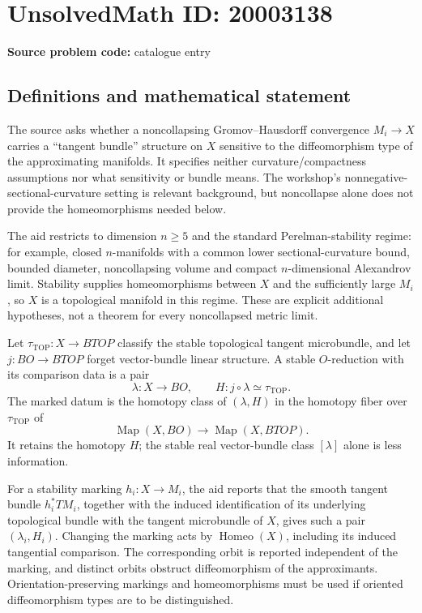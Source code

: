\documentclass[11pt]{article}
\begin{document}
\section*{UnsolvedMath ID: 20003138}
\textbf{Source problem code:} catalogue entry
\subsection{Definitions and mathematical statement}
The source asks whether a noncollapsing Gromov--Hausdorff convergence $M_i\to X$ carries a ``tangent bundle'' structure on $X$ sensitive to the diffeomorphism type of the approximating manifolds. It specifies neither curvature/compactness assumptions nor what sensitivity or bundle means. The workshop's nonnegative-sectional-curvature setting is relevant background, but noncollapse alone does not provide the homeomorphisms needed below.

The aid restricts to dimension $n\geq5$ and the standard Perelman-stability regime: for example, closed $n$-manifolds with a common lower sectional-curvature bound, bounded diameter, noncollapsing volume and compact $n$-dimensional Alexandrov limit. Stability supplies homeomorphisms between $X$ and the sufficiently large $M_i$, so $X$ is a topological manifold in this regime. These are explicit additional hypotheses, not a theorem for every noncollapsed metric limit.

Let $\tau_{\mathrm{TOP}}:X\to BTOP$ classify the stable topological tangent microbundle, and let $j:BO\to BTOP$ forget vector-bundle linear structure. A stable $O$-reduction with its comparison data is a pair
\[
 \lambda:X\to BO,\qquad H:j\circ\lambda\simeq\tau_{\mathrm{TOP}}.
\]
The marked datum is the homotopy class of $(\lambda,H)$ in the homotopy fiber over $\tau_{\mathrm{TOP}}$ of
\[
 \operatorname{Map}(X,BO)\longrightarrow\operatorname{Map}(X,BTOP).
\]
It retains the homotopy $H$; the stable real vector-bundle class $[\lambda]$ alone is less information.

For a stability marking $h_i:X\to M_i$, the aid reports that the smooth tangent bundle $h_i^*TM_i$, together with the induced identification of its underlying topological bundle with the tangent microbundle of $X$, gives such a pair $(\lambda_i,H_i)$. Changing the marking acts by $\operatorname{Homeo}(X)$, including its induced tangential comparison. The corresponding orbit is reported independent of the marking, and distinct orbits obstruct diffeomorphism of the approximants. Orientation-preserving markings and homeomorphisms must be used if oriented diffeomorphism types are to be distinguished.
\end{document}
